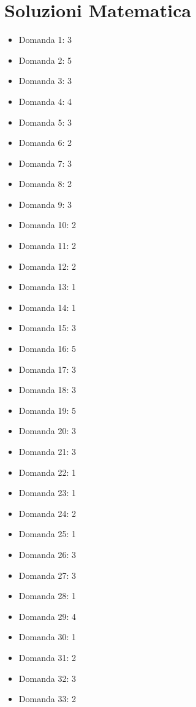 \documentclass[20pt, a4paper]{article}
\begin{document}
\section*{Soluzioni Matematica}
\begin{itemize}[leftmargin=*]
\item [Matematica] Domanda 1: 3
\item [Matematica] Domanda 2: 5
\item [Matematica] Domanda 3: 3
\item [Matematica] Domanda 4: 4
\item [Matematica] Domanda 5: 3
\item [Matematica] Domanda 6: 2
\item [Matematica] Domanda 7: 3
\item [Matematica] Domanda 8: 2
\item [Matematica] Domanda 9: 3
\item [Matematica] Domanda 10: 2
\item [Matematica] Domanda 11: 2
\item [Matematica] Domanda 12: 2
\item [Matematica] Domanda 13: 1
\item [Matematica] Domanda 14: 1
\item [Matematica] Domanda 15: 3
\item [Matematica] Domanda 16: 5
\item [Matematica] Domanda 17: 3
\item [Matematica] Domanda 18: 3
\item [Matematica] Domanda 19: 5
\item [Matematica] Domanda 20: 3
\item [Matematica] Domanda 21: 3
\item [Matematica] Domanda 22: 1
\item [Matematica] Domanda 23: 1
\item [Matematica] Domanda 24: 2
\item [Matematica] Domanda 25: 1
\item [Matematica] Domanda 26: 3
\item [Matematica] Domanda 27: 3
\item [Matematica] Domanda 28: 1
\item [Matematica] Domanda 29: 4
\item [Matematica] Domanda 30: 1
\item [Matematica] Domanda 31: 2
\item [Matematica] Domanda 32: 3
\item [Matematica] Domanda 33: 2

\end{itemize}
\end{document}
